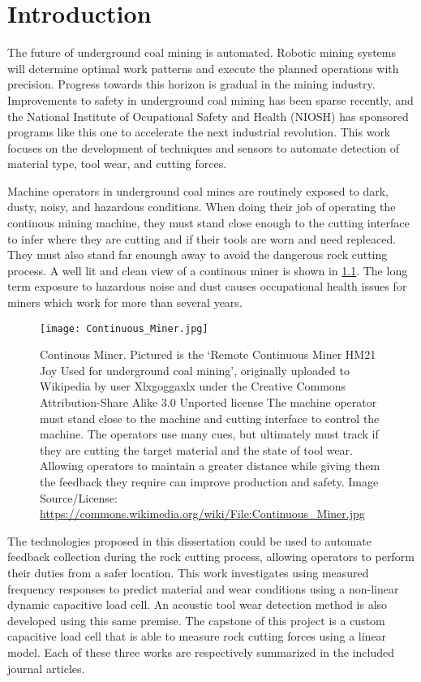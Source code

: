 \chapter{Introduction}\label{chap:1}

The future of underground coal mining is automated. 
Robotic mining systems will determine optimal work patterns and execute
the planned operations with precision.
Progress towards this horizon is gradual in the mining industry.
Improvements to safety in underground coal mining has been sparse recently,
and the National Institute of Ocupational Safety and Health (NIOSH) has sponsored
programs like this one to accelerate the next industrial revolution.
This work focuses on the development of techniques and sensors to automate detection
of material type, tool wear, and cutting forces.

Machine operators in underground coal mines are routinely exposed to dark, dusty, noisy, and
hazardous conditions. When doing their job of operating the continous mining machine,
they must stand close enough to the cutting interface to infer where they are cutting and 
if their tools are worn and need repleaced. They must also stand far enoungh away to avoid
the dangerous rock cutting process. 
A well lit and clean view of a continous miner is shown in \ref{fig:conminer}.
 The long term exposure to hazardous noise and dust causes 
occupational health issues for miners which work for more than several years.

\begin{figure}[ht]
\centering
\texttt{[image: Continuous\_Miner.jpg]}
\caption{Continous Miner. Pictured is the `Remote Continuous Miner HM21 Joy Used for underground coal mining',
 originally uploaded to Wikipedia by user Xlxgoggaxlx 
 under the Creative Commons Attribution-Share Alike 3.0 Unported license
 The machine operator must stand close to the machine and cutting interface to control the machine.
The operators use many cues, but ultimately must track if they are cutting the target material and 
the state of tool wear. Allowing operators to maintain a greater distance while giving them
the feedback they require can improve production and safety.
Image Source/License: \url{https://commons.wikimedia.org/wiki/File:Continuous_Miner.jpg}
}
\label{fig:conminer}
\end{figure}

The technologies proposed in this dissertation could be used to automate feedback collection
during the rock cutting process, allowing operators to perform their duties from a safer location.
This work investigates using measured frequency responses to predict material and wear conditions
using a non-linear dynamic capacitive load cell. 
An acoustic tool wear detection method is also developed using this same premise.
The capstone of this project is a custom capacitive load cell that is able to measure 
rock cutting forces using a linear model. 
Each of these three works are respectively summarized in the included journal articles.

